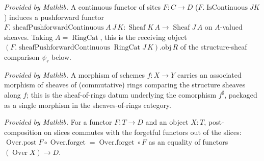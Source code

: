\begin{lemma}
  \label{lem:sheafPushforwardContinuous_mathlib}
  \mathlibok
  \textit{Provided by Mathlib.}
  A continuous functor of sites \(F : C \to D\) (\(F.\operatorname{IsContinuous} J K\)) induces a
  pushforward functor \(F.\operatorname{sheafPushforwardContinuous} A\,J\,K : \operatorname{Sheaf}
  K\,A \to \operatorname{Sheaf} J\,A\) on \(A\)-valued sheaves. Taking \(A = \operatorname{RingCat}\),
  this is the receiving object \((F.\operatorname{sheafPushforwardContinuous} \operatorname{RingCat}
  J\,K).\mathrm{obj}\,R\) of the structure-sheaf comparison \(\psi_r\) below.
\end{lemma}

\begin{lemma}
  \label{lem:scheme_hom_toRingCatSheafHom_mathlib}
  \mathlibok
  \textit{Provided by Mathlib.}
  A morphism of schemes \(f : X \to Y\) carries an associated morphism of sheaves of (commutative)
  rings comparing the structure sheaves along \(f\); this is the sheaf-of-rings datum underlying the
  comorphism \(f^\sharp\), packaged as a single morphism in the sheaves-of-rings category.
\end{lemma}

\begin{lemma}
  \label{lem:over_post_forget_mathlib}
  \mathlibok
  \textit{Provided by Mathlib.}
  For a functor \(F : T \to D\) and an object \(X : T\), post-composition on slices commutes with the
  forgetful functors out of the slices: \(\operatorname{Over.post} F \circ \operatorname{Over.forget} =
  \operatorname{Over.forget} \circ F\) as an equality of functors \((\operatorname{Over} X) \to D\).
\end{lemma}

